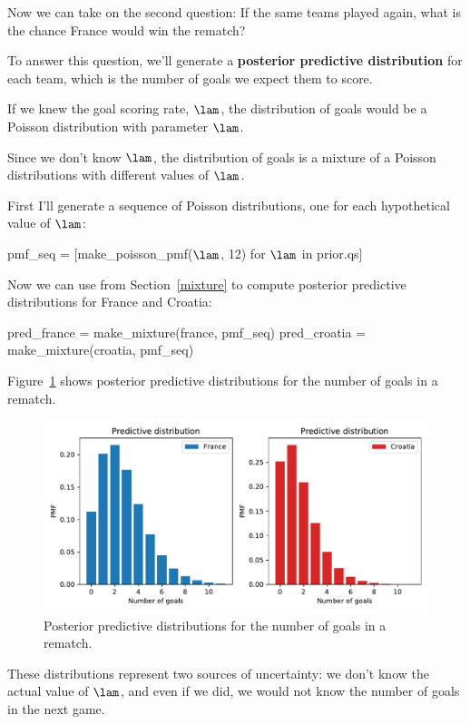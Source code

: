\documentclass[12pt]{book}
\theoremstyle{exercise}
\begin{document}
Now we can take on the second question: If the same teams played again, what is the chance France would win the rematch?

To answer this question, we'll generate a {\bf posterior predictive distribution} for each team, which is the number of goals we expect them to score.

If we knew the goal scoring rate, $\lam$, the distribution of goals would be a Poisson distribution with parameter $\lam$.

Since we don't know $\lam$, the distribution of goals is a mixture of a Poisson distributions with different values of $\lam$.

First I'll generate a sequence of Poisson distributions, one for each hypothetical value of $\lam$:

\begin{code}
pmf_seq = [make_poisson_pmf($\lam$, 12) for $\lam$ in prior.qs]
\end{code}

Now we can use  from Section~\ref{mixture} to compute posterior predictive distributions for France and Croatia:

\begin{code}
pred_france = make_mixture(france, pmf_seq)
pred_croatia = make_mixture(croatia, pmf_seq)
\end{code}

Figure~\ref{fig07-04} shows posterior predictive distributions for the number of goals in a rematch.

\begin{figure}
\centerline{\includegraphics[width=5.5in]{figs/fig07-04.pdf}}
\caption{Posterior predictive distributions for the number of goals in a rematch.}
\label{fig07-04}
\end{figure}

These distributions represent two sources of uncertainty: we don't know the actual value of $\lam$, and even if we did, we would not know the number of goals in the next game.
\end{document}
